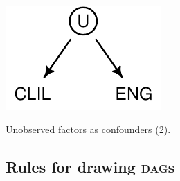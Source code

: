 \documentclass[a4paper]{tufte-book}\usepackage[]{graphicx}\usepackage[]{xcolor}
\begin{document}
\begin{marginfigure}
  \centering
  \includegraphics{figure/dag-confound2-1}
  \caption{Unobserved factors as confounders (2).}
  \label{fig:dag4}
\end{marginfigure}

\subsection{Rules for drawing \textsc{dag}s}
\end{document}
